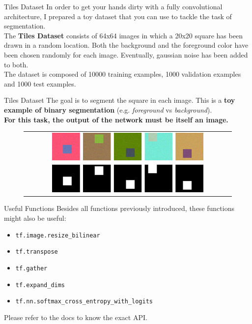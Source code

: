 \documentclass[aspectratio=169]{beamer}
\begin{document}
\begin{frame}{Tiles Dataset}
In order to get your hands dirty with a fully convolutional architecture, I prepared a toy dataset that you can use to tackle the task of segmentation.\\
\vspace{0.5cm}
The \textbf{Tiles Dataset} consists of 64x64 images in which a 20x20 square has been drawn in a random location. Both the background and the foreground color have been chosen randomly for each image. Eventually, gaussian noise has been added to both.\\
\vspace{0.5cm}
The dataset is composed of 10000 training examples, 1000 validation examples and 1000 test examples.
\end{frame}


\begin{frame}{Tiles Dataset}
The goal is to segment the square in each image. This is a \textbf{toy example of binary segmentation} (e.g. \textit{foreground} vs \textit{background}).\\
\vspace{0.5cm}
\textbf{For this task, the output of the network must be itself an image.}
\begin{figure}
\begin{tabular}{c}
\includegraphics[width=0.75\textwidth]{img/tf/tiles_dataset.png}
\end{tabular}
\end{figure}
\end{frame}


\begin{frame}{Useful Functions}
Besides all functions previously introduced, these functions might also be useful:
\begin{itemize}
\item \texttt{tf.image.resize\_bilinear}
\item \texttt{tf.transpose}
\item \texttt{tf.gather}
\item \texttt{tf.expand\_dims}
\item \texttt{tf.nn.softmax\_cross\_entropy\_with\_logits}
\end{itemize}
Please refer to the docs to know the exact API.
\end{frame}
\end{document}
